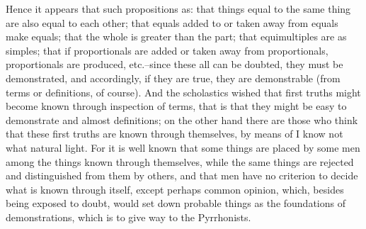\documentclass[polutonikogreek,english,twoside,openright]{article}
\begin{document}
Hence it appears that such propositions as: that things equal to the same
thing are also equal to each other; that equals added to or taken away from
equals make equals; that the whole is greater than the part; that
equimultiples are as simples; that if proportionals are added or taken away
from proportionals, proportionals are produced, etc.\---since these all can
be doubted, they must be demonstrated, and accordingly, if they are true, they
are demonstrable (from terms or definitions, of course).  And the scholastics
wished that first truths might become known through inspection of terms, that
is that they might be easy to demonstrate and almost definitions; on the other
hand there are those who think that these first truths are known through
themselves, by means of I know not what natural light.  For it is well known
that some things are placed by some men among the things known through
themselves, while the same things are rejected and distinguished from them by
others, and that men have no criterion to decide what is known through itself,
except perhaps common opinion, which, besides being exposed to doubt, would
set down probable things as the foundations of demonstrations, which is to
give way to the Pyrrhonists.
\end{document}
